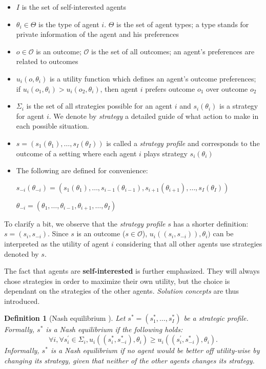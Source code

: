 \documentclass[12pt, a4paper]{article}
\newtheorem{Def}{Definition}[subsection]
\begin{document}
\begin{itemize}
    \item $I$ is the set of self-interested agents
    \item $\theta_i\in \Theta$ is the type of agent $i$. $\Theta$ is the set of
        agent types; a type stands for private information of the agent and his
        preferences
    \item $o \in \mathcal{O}$ is an outcome; $\mathcal{O}$ is the set of all
        outcomes; an agent's preferences are related to outcomes 
    \item $u_i(o, \theta_i)$ is a utility function which defines an agent's
        outcome preferences; if $u_i(o_1, \theta_i) > u_i(o_2, \theta_i)$, then
        agent $i$ prefers outcome $o_1$ over outcome $o_2$
    \item $\Sigma_i$ is the set of all strategies possible for an agent $i$ and
        $s_i(\theta_i)$ is a strategy for agent $i$. We denote by
        \emph{strategy} a detailed guide of what action to make in each
        possible situation.
    \item $s = (s_1(\theta_1),\dots,s_I(\theta_I))$ is called a \emph{ strategy
        profile} and corresponds to the outcome of a setting where
        each agent $i$ plays strategy $s_i(\theta_i)$
    \item The following are defined for convenience: 

        $s_{-i}(\theta_{-i}) = (s_1(\theta_1),\dots,s_{i-1}(\theta_{i-1}), s_{i+1}(\theta_{i+1}),\dots,s_I(\theta_I))$

        $\theta_{-i}=(\theta_1,\dots,\theta_{i-1},\theta_{i+1},\dots,\theta_I)$
\end{itemize}

To clarify a bit, we observe that the \emph{strategy profile} $s$ has a shorter
definition: $s = (s_i, s_{-i})$. Since $s$ is an outcome ($s \in \mathcal{O}$),
$u_i((s_i, s_{-i})), \theta_i)$ can be interpreted as the utility of agent $i$
considering that all other agents use strategies denoted by $s$.

The fact that agents are \textbf{self-interested} is further emphasized. They
will always chose strategies in order to maximize their own utility, but the
choice is dependant on the strategies of the other agents. \emph{Solution
concepts} are thus introduced.

\begin{Def}[Nash equilibrium \cite{weiss}]
    Let $s^*=(s_1^*,\dots,s_I^*)$ be a \emph{strategic profile}. Formally,
    $s^*$ is a \emph{Nash equilibrium} if the following holds:
    $$\forall i, \forall s_i^{'} \in \Sigma_i, u_i((s_i^*, s_{-i}^*), \theta_i)
    \geq u_i((s_i^{'},s_{-i}^*), \theta_i).$$
    Informally, $s^*$ is a \emph{Nash equilibrium} if no agent 
    would be better off utility-wise by changing its strategy, 
    given that neither of the other agents changes its strategy.
\end{Def}
\end{document}
